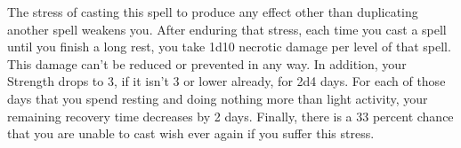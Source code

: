 \documentclass[letterpaper, 11pt, bg=full, twocolumn, stats=modern]{dndbook}
\begin{document}
The stress of casting this spell to produce any effect other than duplicating another spell weakens you. After enduring that stress, each time you cast a spell until you finish a long rest, you take 1d10 necrotic damage per level of that spell. This damage can't be reduced or prevented in any way. In addition, your Strength drops to 3, if it isn't 3 or lower already, for 2d4 days. For each of those days that you spend resting and doing nothing more than light activity, your remaining recovery time decreases by 2 days. Finally, there is a 33 percent chance that you are unable to cast wish ever again if you suffer this stress.
\end{document}
